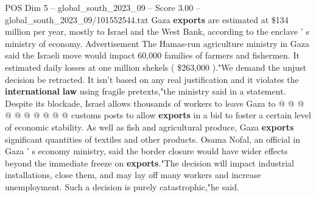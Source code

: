 \begin{textsample}{POS Dim 5 – global\_south\_2023\_09 – Score 3.00 – global\_south\_2023\_09/101552544.txt}
Gaza \textbf{exports} are estimated at \$134 million per year, mostly to Israel and the West Bank, according to the enclave ' s ministry of economy.
Advertisement The Hamas-run agriculture ministry in Gaza said the Israeli move would impact 60,000 families of farmers and fishermen.
It estimated daily losses at one million shekels ( \$263,000 )."We demand the unjust decision be retracted.
It isn't based on any real justification and it violates the \textbf{international} \textbf{law} using fragile pretexts,"the ministry said in a statement.
Despite its blockade, Israel allows thousands of workers to leave Gaza to @ @ @ @ @ @ @ @ @ @ customs posts to allow \textbf{exports} in a bid to foster a certain level of economic stability.
As well as fish and agricultural produce, Gaza \textbf{exports} significant quantities of textiles and other products.
Osama Nofal, an official in Gaza ' s economy ministry, said the border closure would have wider effects beyond the immediate freeze on \textbf{exports}."The decision will impact industrial installations, close them, and may lay off many workers and increase unemployment.
Such a decision is purely catastrophic,"he said.

\end{textsample}
